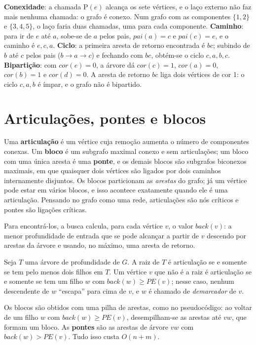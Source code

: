 \begin{exemplo}\label{ex:dfsapl}
\textbf{Conexidade}: a chamada \textsc{P}$(e)$ alcança os sete vértices, e o laço externo não faz mais nenhuma chamada: o grafo é conexo. Num grafo com as componentes $\{1,2\}$ e $\{3,4,5\}$, o laço faria duas chamadas, uma para cada componente.
\textbf{Caminho}: para ir de $e$ até $a$, sobe-se de $a$ pelos pais, $pai(a)=c$ e $pai(c)=e$, e o caminho é $e,c,a$.
\textbf{Ciclo}: a primeira aresta de retorno encontrada é $bc$; subindo de $b$ até $c$ pelos pais ($b\to a\to c$) e fechando com $bc$, obtém-se o ciclo $c,a,b,c$.
\textbf{Bipartição}: com $cor(e)=0$, a árvore dá $cor(c)=1$, $cor(a)=0$, $cor(b)=1$ e $cor(d)=0$. A aresta de retorno $bc$ liga dois vértices de cor 1: o ciclo $c,a,b$ é ímpar, e o grafo não é bipartido.
\end{exemplo}

\section{Articulações, pontes e blocos}\label{sec:articulacoes}
Uma \textbf{articulação} é um vértice cuja remoção aumenta o número de componentes conexas. Um \textbf{bloco} é um subgrafo maximal conexo e sem articulações; um bloco com uma única aresta é uma \textbf{ponte}, e os demais blocos são subgrafos biconexos maximais, em que quaisquer dois vértices são ligados por dois caminhos internamente disjuntos. Os blocos particionam as \emph{arestas} do grafo; já um vértice pode estar em vários blocos, e isso acontece exatamente quando ele é uma articulação. Pensando no grafo como uma rede, articulações são nós críticos e pontes são ligações críticas.

Para encontrá-los, a busca calcula, para cada vértice $v$, o valor $back(v)$: a menor profundidade de entrada que se pode alcançar a partir de $v$ descendo por arestas da árvore e usando, no máximo, uma aresta de retorno.
\begin{teo}[Articulações]
Seja $T$ uma árvore de profundidade de $G$. A raiz de $T$ é articulação se e somente se tem pelo menos dois filhos em $T$. Um vértice $v$ que não é a raiz é articulação se e somente se tem um filho $w$ com $back(w)\ge PE(v)$; nesse caso, nenhum descendente de $w$ ``escapa'' para cima de $v$, e $w$ é chamado de \emph{demarcador} de $v$.
\end{teo}
Os blocos são obtidos com uma pilha de arestas, como no pseudocódigo: ao voltar de um filho $w$ com $back(w)\ge PE(v)$, desempilham-se as arestas até $vw$, que formam um bloco. As \textbf{pontes} são as arestas de árvore $vw$ com $back(w)>PE(v)$. Tudo isso custa $O(n+m)$.

